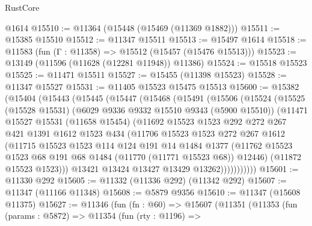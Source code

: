 \begin{lexlean}{RustCore}
\begin{coremodule}
    @1614
@15510 := @11364 (@15448 (@15469 (@11369 @1882)))
@15511 := @15385 @15510
@15512 := @11347 @15511
@15513 := @15497 @1614
@15518 := @11583 (fun (Γ : @11358) => @15512 (@15457 (@15476 @15513)))
@15523 := @13149 (@11596 (@11628 (@12281 @11948)) @11386)
@15524 := @15518 @15523
@15525 := @11471 @15511
@15527 := @15455 (@11398 @15523)
@15528 := @11347 @15527
@15531 := @11405 @15523 @15475 @15513
@15600 := @15382
    (@15404
      (@15443
        (@15445
          (@15447
            (@15468
              (@15491
                (@15506
                  (@15524
                    (@15525
                      (@15528 @15531)
                      (@6029 @9336 @9332 @15510 @9343 (@5900 @15510))
                      (@11471
                        @15527
                        @15531
                        (@11658 @15454)
                        (@11692
                          @15523
                          @1523
                          @292
                          @272
                          @267
                          @421
                          @1391
                          @1612
                          @1523
                          @434
                          (@11706
                            @15523
                            @1523
                            @272
                            @267
                            @1612
                            (@11715
                              @15523
                              @1523
                              @114
                              @124
                              @191
                              @14
                              @1484
                              @1377
                              (@11762
                                @15523
                                @1523
                                @68
                                @191
                                @68
                                @1484
                                (@11770 (@11771 @15523 @68))
                                @12446)
                              (@11872 @15523 @1523)))
                          @13421
                          @13424
                          @13427
                          @13429
                          @13262)))))))))))
@15601 := @11330 @292
@15605 := @11332 (@11336 @292) (@11342 @292)
@15607 := @11347 (@11166 @11348)
@15608 := @5879 @9356
@15610 := @11347 (@15608 @11375)
@15627 := @11346
    (fun (fn : @60) =>
    @15607
      (@11351
        (@11353
          (fun (params : @5872) =>
          @11354
            (fun (rty : @1196) =>

\end{coremodule}
\end{lexlean}
